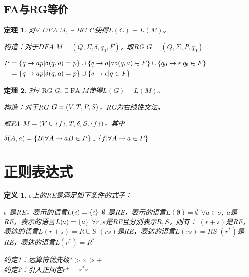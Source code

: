 \documentclass[twocolumn,zihao=5,linespread=1,heading=false,autoindent=0pt]{ctexart}
\DeclarePairedDelimiter{\set}{\{}{\}}
\DeclarePairedDelimiter{\paren}{(}{)}
\theoremstyle{exampstyle} \newtheorem{definition}{定义}[section]
\theoremstyle{exampstyle} \newtheorem{example}{例}[section]
\theoremstyle{exampstyle} \newtheorem{theorem}{定理}[section]
\theoremstyle{exampstyle} \newtheorem{lemma}{引理}[section]
\theoremstyle{exampstyle} \newtheorem{myproof}{证明}[section]
\begin{document}
\subsection{FA与RG等价}

\begin{theorem}
    对$\forall\;DFA\;M,\;\exists\;RG\;G$使得$L(G) = L(M)$。

    构造：对于$DFA\; M=(Q,\Sigma,\delta,q_0, F)$，取RG
    $G=(Q, \Sigma, P, q_0)$

    $\begin{aligned}
        P &= \set*{q \to ap | \delta(q, a) = p} \cup 
    \set*{q \to a | \forall \delta(q, a) \in F} \cup
    \set*{q_0 \to \epsilon | q_0 \in F} \\
        & = \set*{q \to ap | \delta(q, a) = p} \cup 
        \set*{q \to \epsilon | q \in F} \\
    \end{aligned}$
\end{theorem}

\begin{theorem}
    对$\forall\;\text{RG}\;G,\;\exists\; \text{FA} \;M$使得$L(G) = L(M)$。

    构造：对于RG $G=\paren*{V, T, P, S}$，RG为右线性文法。

    取FA $M=(V \cup \set*{f},T,\delta,S, \set*{f})$，其中

    $\delta(A, a) = \set*{B | \forall A \to aB \in P} \cup 
    \set*{f | \forall A \to a \in P} 
    $
\end{theorem}

\section{正则表达式}

\begin{definition}
    $\sigma$上的RE是满足如下条件的式子：
    \begin{outline}[citemize]
        \1 $\epsilon$ 是RE，表示的语言$L(\epsilon) = \set*{\epsilon}$
        \1 $\emptyset$ 是RE，表示的语言$L(\emptyset) = \emptyset$
        \1 $\forall a \in \sigma,\; a$是RE，表示的语言$L(a) = \set{a}$
        \1 $\forall r, s$是RE且分别表示$R,S$，则有：
            \2 $(r+s)$是RE，表达的语言$L(r+s) = R \cup S$
            \2 $(rs)$是RE，表达的语言$L(rs) = RS$
            \2 $(r^*)$是RE，表达的语言$L(r^*) = R^*$
    \end{outline}
    约定1：运算符优先级$* > \times > +$ \\
    约定2：引入正闭包$r^+ = r^*r$
\end{definition}
\end{document}
